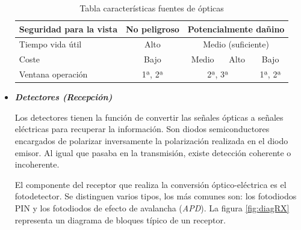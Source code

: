 \begin{itemize}
\begin{table}[H]
\begin{tabular}{l|c|c|c|c|}
  				\multicolumn{1}{|l|}{\cellcolor[HTML]{EFEFEF}Seguridad para la vista}          & No peligroso                         & \multicolumn{3}{c|}{Potencialmente dañino}                                                                                  \\ \hline
  				\multicolumn{1}{|l|}{\cellcolor[HTML]{EFEFEF}Tiempo vida útil}                 & Alto                                 & \multicolumn{3}{c|}{Medio (suficiente)}                                                                                     \\ \hline
  				\multicolumn{1}{|l|}{\cellcolor[HTML]{EFEFEF}Coste}                            & Bajo                                 & Medio                                   & Alto                                     & Bajo                                   \\ \hline
  				\multicolumn{1}{|l|}{\cellcolor[HTML]{EFEFEF}Ventana operación}                & 1ª, 2ª                               & \multicolumn{2}{c|}{2ª, 3ª}                                                        & 1ª, 2ª                                 \\ \hline
  			\end{tabular}
  		\caption{Tabla características fuentes de ópticas}
  		\label{tabla:caractFuentes}
  		\end{table}
  	
 		\item \textit{\textbf{Detectores (Recepción)}}
 			
 	Los detectores tienen la función de convertir las señales ópticas a señales eléctricas para recuperar la información. Son diodos semiconductores encargados de polarizar inversamente la polarización realizada en el diodo emisor.  Al igual que pasaba en la transmisión, existe detección coherente o incoherente. 
 	
 	El componente del receptor que realiza la conversión óptico-eléctrica es el fotodetector. Se distinguen varios tipos, los más comunes son: los fotodiodos PIN y los fotodiodos de efecto de avalancha (\textit{APD}).
 	La figura \ref{fig:diagRX} representa un diagrama de bloques típico de un receptor. %
 		

\end{itemize}
